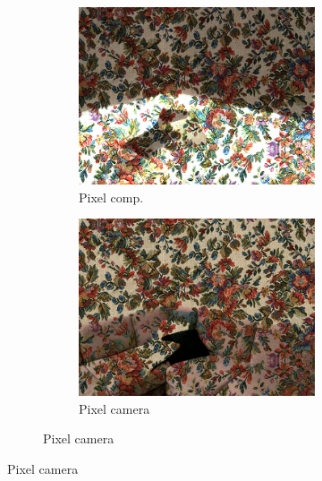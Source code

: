 \begin{figure}[]
\begin{subfigure}{\textwidth}
\begin{subfigure}{0.24\textwidth}
            \includegraphics[width=\textwidth]{images/04-experiment02/sofa/flowers/pixel_im.jpg}
            \caption*{Pixel comp.}
        \end{subfigure}
        \hfill
        \begin{subfigure}{0.24\textwidth}
            \centering
            \includegraphics[width=\textwidth]{images/04-experiment02/sofa/flowers/pixel_proj.jpg}
            \caption*{Pixel camera}
        \end{subfigure}
    \end{subfigure}


\end{figure}
